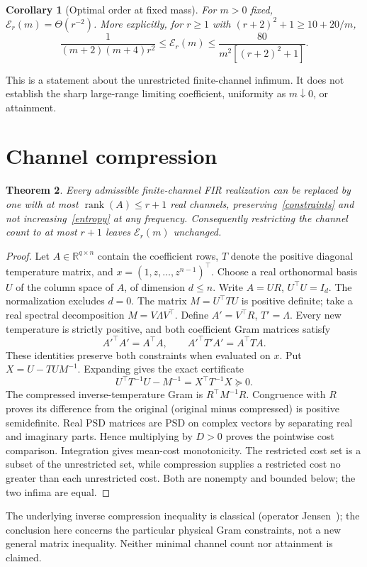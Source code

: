 \documentclass[11pt]{article}
\newtheorem{theorem}{Theorem}
\newtheorem{corollary}[theorem]{Corollary}
\newcommand{\R}{\mathbb R}
\newcommand{\opt}{\mathcal E_r(m)}
\begin{document}
\begin{corollary}[Optimal order at fixed mass]\label{theta}
For $m>0$ fixed, $\opt=\Theta(r^{-2})$. More explicitly, for $r\ge1$ with $(r+2)^2+1\ge10+20/m$,
\begin{equation}
\frac1{(m+2)(m+4)r^2}\le\opt\le\frac{80}{m^2[(r+2)^2+1]}.
\end{equation}
\end{corollary}
This is a statement about the unrestricted finite-channel infimum. It does not establish the sharp large-range limiting coefficient, uniformity as $m\downarrow0$, or attainment.

\section{Channel compression}
\begin{theorem}\label{compress}
Every admissible finite-channel FIR realization can be replaced by one with at most $\operatorname{rank}(A)\le r+1$ real channels, preserving~\eqref{constraints} and not increasing~\eqref{entropy} at any frequency. Consequently restricting the channel count to at most $r+1$ leaves $\opt$ unchanged.
\end{theorem}
\begin{proof}
Let $A\in\R^{q\times n}$ contain the coefficient rows, $T$ denote the positive diagonal temperature matrix, and $x=(1,z,\ldots,z^{n-1})^\top$. Choose a real orthonormal basis $U$ of the column space of $A$, of dimension $d\le n$. Write $A=UR$, $U^\top U=I_d$. The normalization excludes $d=0$. The matrix $M=U^\top TU$ is positive definite; take a real spectral decomposition $M=V\Lambda V^\top$. Define $A'=V^\top R$, $T'=\Lambda$. Every new temperature is strictly positive, and both coefficient Gram matrices satisfy
\begin{equation}
A'^\top A'=A^\top A,\qquad A'^\top T'A'=A^\top TA.
\end{equation}
These identities preserve both constraints when evaluated on $x$. Put $X=U-TUM^{-1}$. Expanding gives the exact certificate
\begin{equation}\label{certificate}
U^\top T^{-1}U-M^{-1}=X^\top T^{-1}X\succeq0.
\end{equation}
The compressed inverse-temperature Gram is $R^\top M^{-1}R$. Congruence with $R$ proves its difference from the original (original minus compressed) is positive semidefinite. Real PSD matrices are PSD on complex vectors by separating real and imaginary parts. Hence multiplying by $D>0$ proves the pointwise cost comparison. Integration gives mean-cost monotonicity. The restricted cost set is a subset of the unrestricted set, while compression supplies a restricted cost no greater than each unrestricted cost. Both are nonempty and bounded below; the two infima are equal.
\end{proof}
The underlying inverse compression inequality is classical (operator Jensen~\cite{hansen}); the conclusion here concerns the particular physical Gram constraints, not a new general matrix inequality. Neither minimal channel count nor attainment is claimed.
\end{document}
